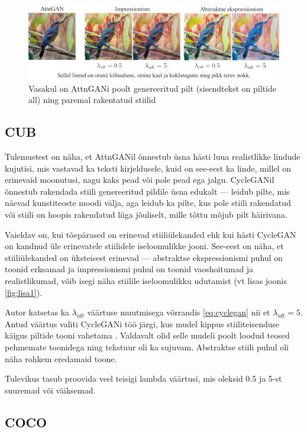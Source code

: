 \documentclass{vilgym}
\begin{document}
	\begin{figure}
		\includegraphics[width=\linewidth]{images/linnud.jpg}
		\caption{Vasakul on AttnGANi poolt genereeritud pilt (sisendtekst on piltide all) ning paremal rakentatud stiilid}
		\label{fig:cub}
	\end{figure}

	\subsection{CUB}
	Tulemustest on näha, et AttnGANil õnnestub üsna hästi luua realistlikke lindude kujutisi, mis vastavad ka teksti kirjeldusele, kuid on see-eest ka linde, millel on erinevaid moonutusi, nagu kaks pead või pole pead ega jalgu. CycleGANil õnnestub rakendada stiili genereeritud pildile üsna edukalt  --- leidub pilte, mis näevad kunstiteoste moodi välja, aga leidub ka pilte, kus pole stiili rakendatud või stiili on hoopis rakendatud liiga jõuliselt, mille tõttu mõjub pilt häirivana.

	Vaieldav on, kui tõepärased on erinevad stiiliülekanded ehk kui hästi CycleGAN on kandnud üle erinevatele stiilidele iseloomulikke jooni. See-eest on näha, et stiiliülekanded on üksteisest erinevad --- abstraktse ekspressionismi puhul on toonid erksamad ja impressionismi puhul on toonid vaoshoitumad ja realistlikumad, võib isegi näha stiilile iseloomulikku udutamist (vt lisas joonis \ref{fig:lisa1}).

	Autor katsetas ka $ \lambda_{idt} $ väärtuse muutmisega võrrandis \ref{eq:cyclegan} nii et $ \lambda_{idt} = 5 $. Antud väärtus valiti CycleGANi töö järgi, kus mudel kippus stiiliteisenduse käigus piltide tooni vahetama \parencite{cyclegan}. Valdavalt olid selle mudeli poolt loodud teosed pehmemate toonidega ning tekstuur oli ka sujuvam. Abstraktse stiili puhul oli näha rohkem eredamaid toone.

	Tulevikus tasub proovida veel teisigi lambda väärtusi, mis oleksid 0.5 ja 5-st suuremad või väiksemad. 

	\subsection{COCO}
\end{document}
